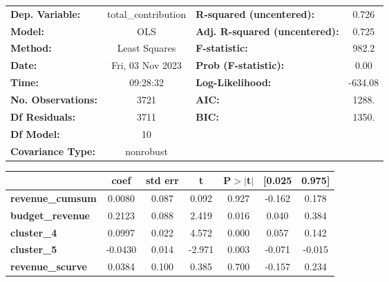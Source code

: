 \begin{center}
\begin{tabular}{lclc}
\toprule
\textbf{Dep. Variable:}           & total\_contribution & \textbf{  R-squared (uncentered):}      &     0.726   \\
\textbf{Model:}                   &         OLS         & \textbf{  Adj. R-squared (uncentered):} &     0.725   \\
\textbf{Method:}                  &    Least Squares    & \textbf{  F-statistic:       }          &     982.2   \\
\textbf{Date:}                    &   Fri, 03 Nov 2023  & \textbf{  Prob (F-statistic):}          &     0.00    \\
\textbf{Time:}                    &       09:28:32      & \textbf{  Log-Likelihood:    }          &   -634.08   \\
\textbf{No. Observations:}        &          3721       & \textbf{  AIC:               }          &     1288.   \\
\textbf{Df Residuals:}            &          3711       & \textbf{  BIC:               }          &     1350.   \\
\textbf{Df Model:}                &            10       & \textbf{                     }          &             \\
\textbf{Covariance Type:}         &      nonrobust      & \textbf{                     }          &             \\
\bottomrule
\end{tabular}
\begin{tabular}{lcccccc}
                                  & \textbf{coef} & \textbf{std err} & \textbf{t} & \textbf{P$> |$t$|$} & \textbf{[0.025} & \textbf{0.975]}  \\
\midrule
\textbf{revenue\_cumsum}          &       0.0080  &        0.087     &     0.092  &         0.927        &       -0.162    &        0.178     \\
\textbf{budget\_revenue}          &       0.2123  &        0.088     &     2.419  &         0.016        &        0.040    &        0.384     \\
\textbf{cluster\_4}               &       0.0997  &        0.022     &     4.572  &         0.000        &        0.057    &        0.142     \\
\textbf{cluster\_5}               &      -0.0430  &        0.014     &    -2.971  &         0.003        &       -0.071    &       -0.015     \\
\textbf{revenue\_scurve}          &       0.0384  &        0.100     &     0.385  &         0.700        &       -0.157    &        0.234     \\

\end{tabular}
\end{center}

